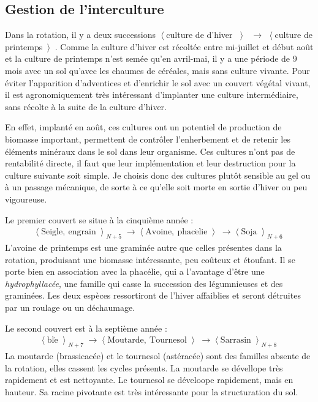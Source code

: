\documentclass{book}
\begin{document}
\subsection{Gestion de l'interculture}

Dans la rotation, il y a deux successions $\left\langle \right. $culture de d'hiver $\left\rangle \right. $ $\longrightarrow$ $\left\langle \right. $culture de printemps$\left\rangle \right. $. Comme la culture d'hiver est récoltée entre mi-juillet et début août et la culture de printemps n'est semée qu'en avril-mai, il y a une période de 9 mois avec un sol qu'avec les chaumes de céréales, mais sans culture vivante. Pour éviter l'apparition d'adventices et d'enrichir le sol avec un couvert végétal vivant, il est agronomiquement très intéressant d'implanter une culture intermédiaire, sans récolte à la suite de la culture d'hiver. 

En effet, implanté en août, ces cultures ont un potentiel de production de biomasse important, permettent de contrôler l'enherbement et de retenir les éléments minéraux dans le sol dans leur organisme. Ces cultures n'ont pas de rentabilité directe, il faut que leur implémentation et leur destruction pour la culture suivante soit simple. Je choisis donc des cultures plutôt sensible au gel ou à un passage mécanique, de sorte à ce qu'elle soit morte en sortie d'hiver ou peu vigoureuse. 

Le premier couvert se situe à la cinquième année :
\begin{align*}
\left\langle \right. \mathrm{Seigle,\ engrain}  \left\rangle \right._{N+5}  \longrightarrow \left\langle \right.\mathrm{Avoine,\ phac\acute{e}lie}\left\rangle \right.\longrightarrow \left\langle \right. \mathrm{Soja} \left\rangle \right._{N+6}
\end{align*}
L'avoine de printemps est une graminée autre que celles présentes dans la rotation, produisant une biomasse intéressante, peu coûteux et étoufant. Il se porte bien en association avec la phacélie, qui a l'avantage d'être une \textit{hydrophyllacée}, une famille qui casse la succession des légumnieuses et des graminées. Les deux espèces ressortiront de l'hiver affaiblies et seront détruites par un roulage ou un déchaumage.

Le second couvert est à la septième année :
\begin{align*}
\left\langle \right. \mathrm{bl\acute{e}}  \left\rangle \right._{N+7}  \longrightarrow \left\langle \right.\mathrm{Moutarde,\ Tournesol}\left\rangle \right.\longrightarrow \left\langle \right. \mathrm{Sarrasin} \left\rangle \right. _{N+8}
\end{align*}
La moutarde (brassicacée) et le tournesol (astéracée) sont des familles absente de la rotation, elles cassent les cycles présents. La moutarde se dévellope très rapidement et est nettoyante. Le tournesol se déveloope rapidement, mais en hauteur. Sa racine pivotante est très intéressante pour la structuration du sol.
\end{document}
